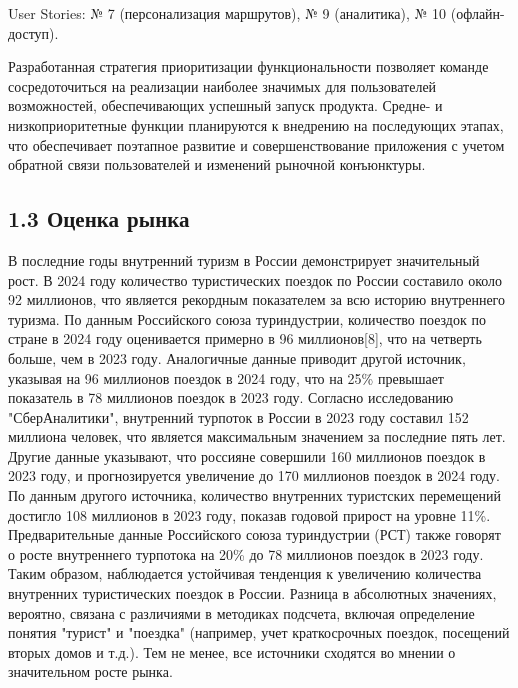 User Stories: № 7 (персонализация маршрутов), № 9 (аналитика), № 10 (офлайн-доступ).

Разработанная стратегия приоритизации функциональности позволяет команде сосредоточиться на реализации наиболее значимых для пользователей возможностей, обеспечивающих успешный запуск продукта. Средне- и низкоприоритетные функции планируются к внедрению на последующих этапах, что обеспечивает поэтапное развитие и совершенствование приложения с учетом обратной связи пользователей и изменений рыночной конъюнктуры.


\subsection*{1.3	Оценка рынка}


В последние годы внутренний туризм в России демонстрирует значительный рост. В 2024 году количество туристических поездок по России составило около 92 миллионов, что является рекордным показателем за всю историю внутреннего туризма. По данным Российского союза туриндустрии, количество поездок по стране в 2024 году оценивается примерно в 96 миллионов[8], что на четверть больше, чем в 2023 году. Аналогичные данные приводит другой источник, указывая на 96 миллионов поездок в 2024 году, что на 25\% превышает показатель в 78 миллионов поездок в 2023 году. Согласно исследованию "СберАналитики", внутренний турпоток в России в 2023 году составил 152 миллиона человек, что является максимальным значением за последние пять лет. Другие данные указывают, что россияне совершили 160 миллионов поездок в 2023 году, и прогнозируется увеличение до 170 миллионов поездок в 2024 году. По данным другого источника, количество внутренних туристских перемещений достигло 108 миллионов в 2023 году, показав годовой прирост на уровне 11\%. Предварительные данные Российского союза туриндустрии (РСТ) также говорят о росте внутреннего турпотока на 20\% до 78 миллионов поездок в 2023 году. Таким образом, наблюдается устойчивая тенденция к увеличению количества внутренних туристических поездок в России. Разница в абсолютных значениях, вероятно, связана с различиями в методиках подсчета, включая определение понятия "турист" и "поездка" (например, учет краткосрочных поездок, посещений вторых домов и т.д.). Тем не менее, все источники сходятся во мнении о значительном росте рынка.

